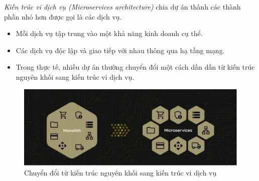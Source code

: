 \emph{Kiến trúc vi dịch vụ (Microservices architecture)} chia dự án thành các thành phần nhỏ hơn được gọi là các dịch vụ.

\begin{itemize}

\item Mỗi dịch vụ tập trung vào một khả năng kinh doanh cụ thể.

\item Các dịch vụ độc lập và giao tiếp với nhau thông qua hạ tầng mạng.

\item Trong thực tế, nhiều dự án thường chuyển đổi một cách dần dần từ kiến trúc nguyên khối sang kiến trúc vi dịch vụ.

\end{itemize}

\begin{figure}[H]

\centering

\includegraphics[scale = 0.4]{pictures/_chuyen_doi_tu_kien_truc_nguyen_khoi_sang_kien_truc_vi_dich_vu/main.drawio.png}

\caption{Chuyển đổi từ kiến trúc nguyên khối sang kiến trúc vi dịch vụ}

\end{figure}